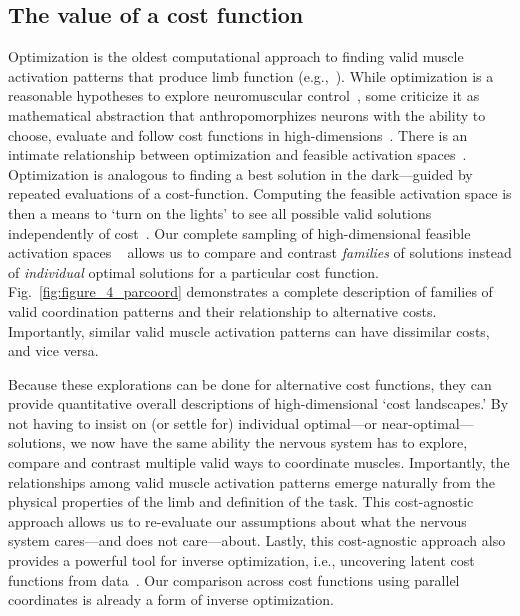 \documentclass[9pt,twocolumn,twoside,lineno]{pnas-new}
\begin{document}
\subsection*{The value of a cost function}

Optimization is the oldest computational approach to finding valid muscle activation patterns that produce limb function (e.g.,~\cite{Chao1978Graphical}).
While optimization is a reasonable hypotheses to explore neuromuscular control~\cite{todorov2002optimal}, some criticize it as mathematical abstraction that anthropomorphizes neurons with the ability to choose, evaluate and follow cost functions in high-dimensions~\cite{deRugy2012habitual,loeb2012optimal}.
There is an intimate relationship between optimization and feasible activation spaces~\cite{chvatal1983linear}. Optimization is analogous to finding a best solution in the dark---guided by repeated evaluations of a cost-function. Computing the feasible activation space is then a means to `turn on the lights' to see all possible valid solutions independently of cost~\cite{valero-cuevas2015fundamentals}. Our complete sampling of high-dimensional feasible activation spaces ~\cite{smith1984efficient,lovasz1999hit} allows us to compare and contrast \emph{families} of solutions instead of \emph{individual} optimal solutions for a particular cost function.
Fig.~\ref{fig:figure_4_parcoord} demonstrates a complete description of families of valid coordination patterns and their relationship to alternative costs. Importantly, similar valid muscle activation patterns can have dissimilar costs, and vice versa.

Because these explorations can be done for alternative cost functions, they can provide quantitative overall descriptions of high-dimensional `cost landscapes.'
By not having to insist on (or settle for) individual optimal---or near-optimal---solutions, we now have the same ability the nervous system has to explore, compare and contrast multiple valid ways to coordinate muscles. Importantly, the relationships among valid muscle activation patterns emerge naturally from the physical properties of the limb and definition of the task. This  cost-agnostic approach allows us to re-evaluate our assumptions about what the nervous system cares---and does not care---about. Lastly, this cost-agnostic approach also provides a powerful tool for inverse optimization, i.e., uncovering latent cost functions from data~\cite{tsirakos1997inverse}. Our comparison across cost functions using parallel coordinates is already a form of inverse optimization.
\end{document}
